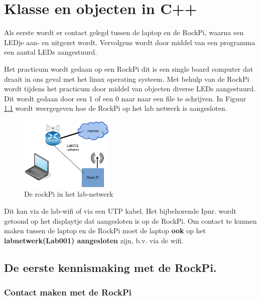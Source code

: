 \chapter{Klasse en objecten in C++}
Als eerste wordt er contact gelegd tussen de laptop en de RockPi, waarna een LEDje aan- en uitgezet wordt. Vervolgens wordt door middel van een programma een aantal LEDs aangestuurd.


Het practicum wordt gedaan op een RockPi dit is een single board computer dat draait in ons geval met het linux operating systeem. Met behulp van de RockPi wordt tijdens het practicum door middel van objecten diverse LEDs aangestuurd. Dit wordt gedaan door een 1 of een 0 naar naar een file te schrijven. In Figuur \ref{fig:netw} wordt weergegeven hoe de RockPi op het lab netwerk is aangesloten.
\begin{figure}[h!]
	\centering
	\begin{center} 	
			\includegraphics[width=0.4\textwidth]{figuren/laBnetwork}
			\caption{De rockPi in het lab-netwerk}
      	\label{fig:netw}   
	\end{center}
\end{figure}
Dit kan via de lab-wifi of via een UTP kabel. Het bijbehorende Ipnr. wordt getoond op het 
displaytje dat aangesloten is op de RockPi. Om contact te kunnen maken tussen de laptop en de RockPi moet de laptop \textbf{ook} op het \textbf{labnetwerk(Lab001) aangesloten} zijn, b.v. via de wifi.


\section{De eerste kennismaking met de RockPi.}


\subsection{Contact maken met de RockPi}\label{chp:contactPi}


